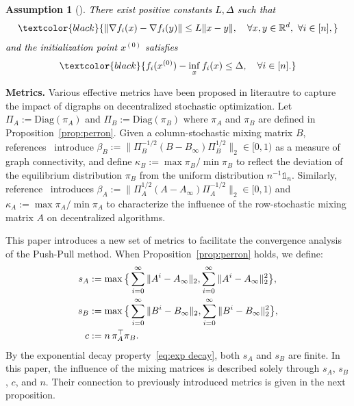 \documentclass[10pt]{article}
\newtheorem{assumption}{Assumption}
\newcommand{\one}{\mathds{1}_n}
\newcommand{\RR}{\mathbb{R}}
\newcommand{\pushpull}{{\sc Push-Pull}\xspace}
\newcommand{\norm}[1]{\| #1 \|}
\newcommand{\revision}[1]{\textcolor{black}{#1}}
\begin{document}
\begin{assumption}[]\label{ass:smooth}
\revision{There exist positive constants $L, \Delta$ such that}
\begin{align*}
\revision{\norm{\nabla f_i(x)-\nabla f_i(y)} \le L\norm{x-y}, \quad \forall x,y\in \RR^d,\ \forall i\in [n],}
\end{align*}
\revision{and the initialization point $x^{(0)}$ satisfies}
\begin{align*}
\revision{f_i(x^{(0)})-\inf_{x}f_i(x) \le \Delta,\quad \forall i\in [n].}
\end{align*}
\end{assumption}

\textbf{Metrics.} Various effective metrics have been proposed in literautre to capture the impact of digraphs on decentralized stochastic optimization. Let \(\Pi_A := \mathrm{Diag}(\pi_A)\) and \(\Pi_B := \mathrm{Diag}(\pi_B)\) where $\pi_A$ and $\pi_B$ are defined in Proposition~\ref{prop:perron}. Given a column-stochastic mixing matrix \(B\), references~\cite{xin2019SAB,liang2025understanding} introduce \(\beta_B := \norm{\Pi_B^{-1/2}(B - B_\infty)\Pi_B^{1/2}}_2 \in [0, 1)\) as a measure of graph connectivity, and define \(\kappa_B := \max \pi_B / \min \pi_B\) to reflect the deviation of the equilibrium distribution \(\pi_B\) from the uniform distribution \(n^{-1}\one\). Similarly, reference~\cite{liang2025understanding} introduces \(\beta_A := \norm{\Pi_A^{1/2}(A - A_\infty)\Pi_A^{-1/2}}_2 \in [0, 1)\) and \(\kappa_A := \max \pi_A / \min \pi_A\) to characterize the influence of the row-stochastic mixing matrix \(A\) on decentralized algorithms. 

This paper introduces a new set of metrics to facilitate the convergence analysis of the \pushpull method. When Proposition~\ref{prop:perron} holds, we define:
\begin{align}
    s_A &:= \max\big\{\sum_{i=0}^\infty \norm{A^i - A_\infty}_2, \sum_{i=0}^\infty \norm{A^i - A_\infty}_2^2\big\},\label{eq:s_A definition}\\
    s_B &:= \max\big\{\sum_{i=0}^\infty \norm{B^i - B_\infty}_2,\sum_{i=0}^\infty \norm{B^i - B_\infty}_2^2\big\},\label{eq:s_B definition} \vspace{2mm}\\ 
    c &:= n\, \pi_A^\top \pi_B.\label{eq:c definition}
\end{align}
By the exponential decay property~\eqref{eq:exp decay}, both $s_A$ and $s_B$ are finite. In this paper, the influence of the mixing matrices is described solely through $s_A$, $s_B$, $c$, and $n$. Their connection to previously introduced metrics is given in the next proposition.  
\end{document}
